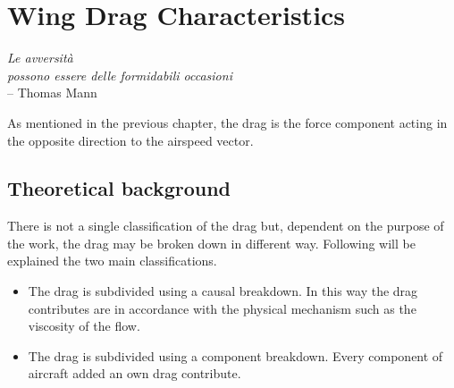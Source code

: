 \chapter{Wing Drag Characteristics}

\label{ch:wingdrag}

\begin{flushright}
	{\smaller
		\textit{Le avversità\\ possono essere delle formidabili occasioni}\\
		-- Thomas Mann}
\end{flushright}
As mentioned in the previous chapter, the drag is the force component acting in the opposite direction to the airspeed vector.\\
\section{Theoretical background}
There is not a single classification of the drag but, dependent on the purpose of the work, the drag may be broken down in different way. Following will be explained the two main classifications.

\begin{itemize}
\item The drag is subdivided using a causal breakdown. In this way the drag contributes are in accordance with the physical mechanism such as the viscosity of the flow.
\item The drag is subdivided using a component breakdown. Every component of aircraft added an own drag contribute.
\end{itemize}

